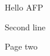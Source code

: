 \documentclass[11pt,a4paper]{article}
\begin{document}
Hello AFP

Second line

Page two
\end{document}
